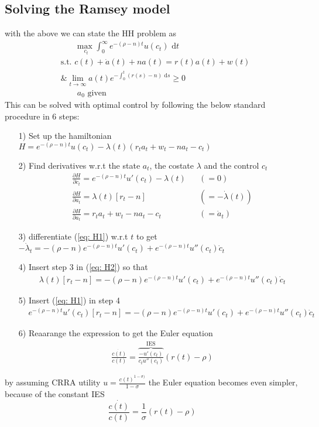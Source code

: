 \documentclass[12pt, a4paper]{article}
\begin{document}
\begin{spacing}{1.213}
\subsection{Solving the Ramsey model}
with the above we can state the HH problem as
\begin{align*}
&\qquad\underset{c_t}{\textrm{max }} \int_0^{\infty} e^{-(\rho-n) t} u( c_t ) \textrm{ d}t
\\
&\textrm{s.t.  } c(t) + \dot{a}(t) + n a(t) = r(t)a(t) + w(t)
\\
&\textrm{\&  }  \lim_{t \rightarrow \infty} a(t) e^{- \int_0^t (r(s)-n) \textrm{ d} s} \geq 0
\\
& \qquad a_0 \textrm{ given}
\end{align*}
This can be solved with optimal control by following the below standard procedure in 6 steps:
\begin{itemize}
\item[1)] Set up the hamiltonian $H = e^{-(\rho -n)t}u(c_t) - \lambda(t)(r_t a_t + w_t - n a_t - c_t)$
\item[2)] Find derivatives w.r.t the state $a_t$, the costate $\lambda$ and the control $c_t$
\begin{align}
&\frac{\partial H}{\partial c_t} = e^{-(\rho -n)t}u'(c_t) - \lambda(t) &&(=0) \label{eq: H1}
\\
&\frac{\partial H}{\partial a_t} = \lambda(t)[r_t -n] && (= - \dot{\lambda}(t) ) \label{eq: H2}
\\
& \frac{\partial H}{\partial a_t} = r_t a_t + w_t - n a_t - c_t && (=\dot{a}_t) \label{eq: H3}
\end{align}
\item[3)] differentiate (\ref{eq: H1}) w.r.t $t$ to get $-\dot{\lambda}_t = -(\rho-n)e^{-(\rho -n)t}u'(c_t) +e^{-(\rho -n)t}u''(c_t) \dot{c}_t$
\item[4)] Insert step 3 in (\ref{eq: H2}) so that
\begin{align*}
&\lambda(t)[r_t -n] = -(\rho-n)e^{-(\rho -n)t}u'(c_t) +e^{-(\rho -n)t}u''(c_t) \dot{c}_t
\end{align*}
\item[5)] Insert (\ref{eq: H1}) in step 4
\begin{align*}
&e^{-(\rho -n)t}u'(c_t)[r_t -n] = -(\rho-n)e^{-(\rho -n)t}u'(c_t) +e^{-(\rho -n)t}u''(c_t) \dot{c}_t
\end{align*}
\item[6)] Reaarange the expression to get the Euler equation
\begin{align*}
& \frac{\dot{c(t)}}{c(t)} = \overbrace{\frac{-u'(c_t)}{c_t u''(c_t)}}^{\textrm{IES}}(r(t) - \rho)
\end{align*}
\end{itemize}
by assuming CRRA utility $u = \frac{c(t)^{1-\sigma)}}{1-\sigma}$ the Euler equation becomes even simpler, because of the constant IES
\begin{equation}
\frac{\dot{c(t)}}{c(t)} = \frac{1}{\sigma}(r(t) - \rho)
\end{equation}


\end{spacing}
\end{document}
